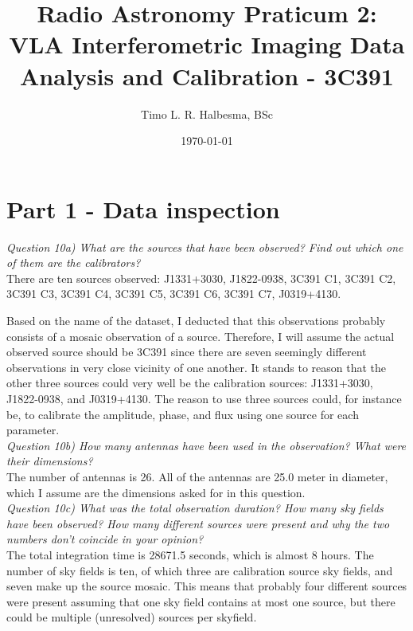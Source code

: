 \documentclass[12pt, a4paper]{article}
\title{Radio Astronomy Praticum 2: VLA Interferometric Imaging Data Analysis and Calibration - 3C391}
\author{Timo L. R. Halbesma, BSc}
\date{\today}
\begin{document}
\maketitle
\vfill
{}

\newpage

\section{Part 1 - Data inspection}
\noindent \textit{Question 10a) What are the sources that have been observed? Find out which one of them are the calibrators?} \\
There are ten sources observed:  J1331+3030, J1822-0938, 3C391 C1, 3C391 C2, 3C391 C3, 3C391 C4, 3C391 C5, 3C391 C6, 3C391 C7, J0319+4130.

Based on the name of the dataset, I deducted that this observations probably consists of a mosaic observation of a source. Therefore, I will assume the actual observed source should be 3C391 since there are seven seemingly different observations in very close vicinity of one another. It stands to reason that  the other three sources could very well be the calibration sources: J1331+3030, J1822-0938, and J0319+4130. The reason to use three sources could, for instance be, to calibrate the amplitude, phase, and flux using one source for each parameter. \\

\noindent \textit{Question 10b) How many antennas have been used in the observation? What were their dimensions?} \\
The number of antennas is 26. All of the antennas are 25.0 meter in diameter, which I assume are the dimensions asked for in this question. \\

\noindent \textit{Question 10c) What was the total observation duration? How many sky fields have been observed? How many different sources were present and why the two numbers don’t coincide in your opinion?} \\
The total integration time is 28671.5 seconds, which is almost 8 hours. The number of sky fields is ten, of which three are calibration source sky fields, and seven make up the source mosaic. This means that probably four different sources were present assuming that one sky field contains at most one source, but there could be multiple (unresolved) sources per skyfield. \\
\end{document}
